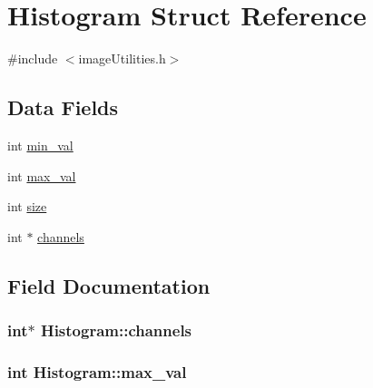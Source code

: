 \hypertarget{struct_histogram}{}\section{Histogram Struct Reference}
\label{struct_histogram}


{\ttfamily \#include $<$image\+Utilities.\+h$>$}

\subsection*{Data Fields}
\begin{DoxyCompactItemize}
\item 
int \hyperlink{struct_histogram_aa635d0511d4e0266b109618ffb261194}{min\+\_\+val}
\item 
int \hyperlink{struct_histogram_af898f1a29579cf3888613b56e1ab488d}{max\+\_\+val}
\item 
int \hyperlink{struct_histogram_a9739df0cd7655cb1bbfb4313a499b851}{size}
\item 
int $\ast$ \hyperlink{struct_histogram_aad65879d1e4f1c24198d2fce8f97a693}{channels}
\end{DoxyCompactItemize}


\subsection{Field Documentation}
\hypertarget{struct_histogram_aad65879d1e4f1c24198d2fce8f97a693}{}
\subsubsection[{channels}]{\setlength{\rightskip}{0pt plus 5cm}int$\ast$ Histogram\+::channels}\label{struct_histogram_aad65879d1e4f1c24198d2fce8f97a693}
\hypertarget{struct_histogram_af898f1a29579cf3888613b56e1ab488d}{}
\subsubsection[{max\+\_\+val}]{\setlength{\rightskip}{0pt plus 5cm}int Histogram\+::max\+\_\+val}\label{struct_histogram_af898f1a29579cf3888613b56e1ab488d}
\hypertarget{struct_histogram_aa635d0511d4e0266b109618ffb261194}{}
